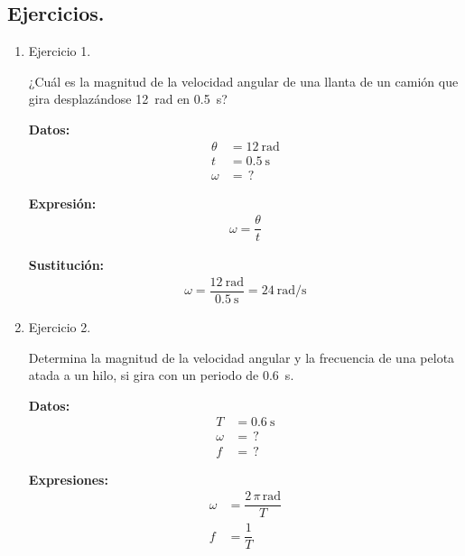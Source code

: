 \documentclass[14pt]{extarticle}
\begin{document}
\subsection{Ejercicios.}

\begin{enumerate}
\item Ejercicio 1.

¿Cuál es la magnitud de la velocidad angular de una llanta de un camión que gira desplazándose \SI{12}{\radian} en \SI{0.5}{\second}?

\vspace*{0.5cm}
\begin{minipage}[t]{0.4\linewidth}
\textbf{Datos:}
\begin{align*}
\theta &= \SI{12}{\radian} \\
t &= \SI{0.5}{\second} \\
\omega &= \, ?
\end{align*}
\end{minipage}
\begin{minipage}[t]{0.4\linewidth}
\textbf{Expresión:}
\begin{align*}
\omega = \dfrac{\theta}{t}
\end{align*}
\end{minipage}

\textbf{Sustitución:}
\begin{align*}
\omega = \dfrac{\SI{12}{\radian}}{\SI{0.5}{\second}} = \SI[per-mode=fraction]{24}{\radian\per\second}
\end{align*}
\item Ejercicio 2.

Determina la magnitud de la velocidad angular y la frecuencia de una pelota atada a un hilo, si gira con un periodo de \SI{0.6}{\second}.

\vspace*{0.5cm}
\begin{minipage}[t]{0.4\linewidth}
\textbf{Datos:}
\begin{align*}
T &= \SI{0.6}{\second} \\
\omega &= \, ? \\
f &= \, ?
\end{align*}
\end{minipage}
\begin{minipage}[t]{0.4\linewidth}
\textbf{Expresiones:}
\begin{align*}
\omega &= \dfrac{2 \, \pi \, \unit{\radian}}{T} \\[0.5em]
f &= \dfrac{1}{T}
\end{align*}
\end{minipage}


\end{enumerate}
\end{document}
